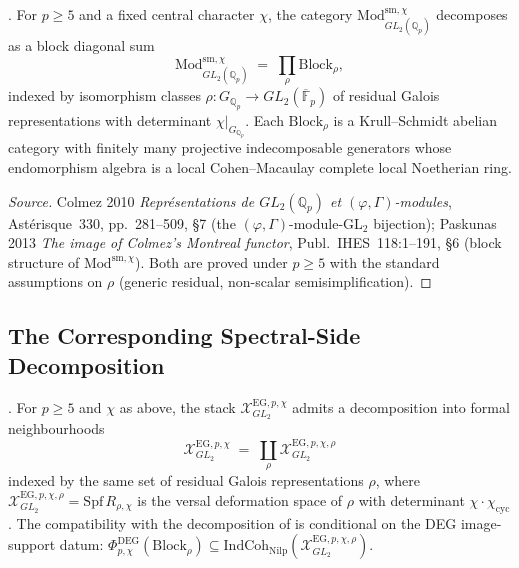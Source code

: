 \begin{theorem}
\label{v4-arith:deg-f1a:thm:colmez-paskunas-blocks}
\ClaimStatusProvedElsewhere. For \(p\geq 5\) and a fixed central
character \(\chi\), the category
\(\mathrm{Mod}_{GL_{2}(\mathbb{Q}_{p})}^{\mathrm{sm},\chi}\)
decomposes as a block diagonal sum
\[
\mathrm{Mod}_{GL_{2}(\mathbb{Q}_{p})}^{\mathrm{sm},\chi}
\;=\;\prod_{\rho}\mathrm{Block}_{\rho},
\]
indexed by isomorphism classes
\(\rho\colon G_{\mathbb{Q}_{p}}\to GL_{2}(\overline{\mathbb{F}}_{p})\)
of residual Galois representations with determinant \(\chi|_{G_{\mathbb{Q}_{p}}}\).
Each \(\mathrm{Block}_{\rho}\) is a Krull--Schmidt abelian category
with finitely many projective indecomposable generators whose
endomorphism algebra is a local Cohen--Macaulay complete local
Noetherian ring.
\end{theorem}

\begin{proof}[Source]
Colmez 2010 \emph{Repr\'esentations de \(GL_{2}(\mathbb{Q}_{p})\) et
\((\varphi,\Gamma)\)-modules}, Ast\'erisque~330, pp.~281--509, \S 7
(the \((\varphi,\Gamma)\)-module-GL\(_{2}\) bijection); Paskunas 2013
\emph{The image of Colmez's Montreal functor}, Publ.~IHES~118:1--191,
\S 6 (block structure of \(\mathrm{Mod}^{\mathrm{sm},\chi}\)). Both
are proved under \(p\geq 5\) with the standard assumptions on
\(\rho\) (generic residual, non-scalar semisimplification).
\end{proof}

\subsection{The Corresponding Spectral-Side Decomposition}

\begin{proposition}
\label{v4-arith:deg-f1a:prop:spectral-blocks}
\ClaimStatusProvedHereConditional. For \(p\geq 5\) and \(\chi\) as above,
the stack \(\mathcal{X}^{\mathrm{EG},p,\chi}_{GL_{2}}\) admits a
decomposition into formal neighbourhoods
\begin{equation}
\label{v4-arith:deg-f1a:eq:EG-block-decomp}
\mathcal{X}^{\mathrm{EG},p,\chi}_{GL_{2}}
\;=\;\coprod_{\rho}\mathcal{X}^{\mathrm{EG},p,\chi,\rho}_{GL_{2}}
\end{equation}
indexed by the same set of residual Galois representations
\(\rho\), where
\(\mathcal{X}^{\mathrm{EG},p,\chi,\rho}_{GL_{2}}=\mathrm{Spf}\,R_{\rho,\chi}\)
is the versal deformation space of \(\rho\) with determinant \(\chi\cdot\chi_{\mathrm{cyc}}\).
The compatibility with the decomposition of
 is conditional on
the DEG image-support datum:
\(\Phi^{\mathrm{DEG}}_{p,\chi}(\mathrm{Block}_{\rho})\subseteq\mathrm{IndCoh}_{\mathrm{Nilp}}(\mathcal{X}^{\mathrm{EG},p,\chi,\rho}_{GL_{2}})\).
\end{proposition}

